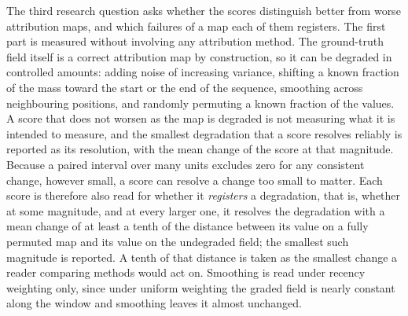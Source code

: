 \documentclass{article}
\newif\ifreview \reviewtrue        %
\newcommand{\rev}[1]{\ifreview\textcolor[HTML]{0B5FA5}{#1}\else#1\fi}
\newcommand{\revwhy}[1]{\ifreview\marginpar{\footnotesize\raggedright\textcolor[HTML]{0B5FA5}{#1}}\fi}
\newcommand{\revw}[1]{\ifreview\textcolor[HTML]{6FA8A0}{#1}\else#1\fi}   %
\begin{document}
The third research question asks whether the scores distinguish better from worse attribution maps, and \rev{which failures of a map each of them registers}.\revwhy{FIX-7: RQ3 without the generator-setting sweep (D25)} The first part is measured without involving any attribution method. The ground-truth field itself is a correct attribution map by construction, so it can be degraded in controlled amounts: adding noise of increasing variance, shifting a known fraction of the mass toward the start or the end of the sequence, smoothing across neighbouring positions, and randomly permuting a known fraction of the values. A score that does not \revw{worsen} as the map is degraded is not measuring what it is intended to measure, and the smallest degradation that a score resolves reliably is reported as its resolution\rev{, with the mean change of the score at that magnitude. Because a paired interval over many units excludes zero for any consistent change, however small, a score can resolve a change too small to matter. Each score is therefore also read for whether it \emph{registers} a degradation, that is, whether at some magnitude, and at every larger one, it resolves the degradation with a mean change of at least a tenth of the distance between its value on a fully permuted map and its value on the undegraded field; the smallest such magnitude is reported. A tenth of that distance is taken as the smallest change a reader comparing methods would act on. Smoothing is read under recency weighting only, since under uniform weighting the graded field is nearly constant along the window and smoothing leaves it almost unchanged}.\revwhy{X5: registers reading}
 
\end{document}
